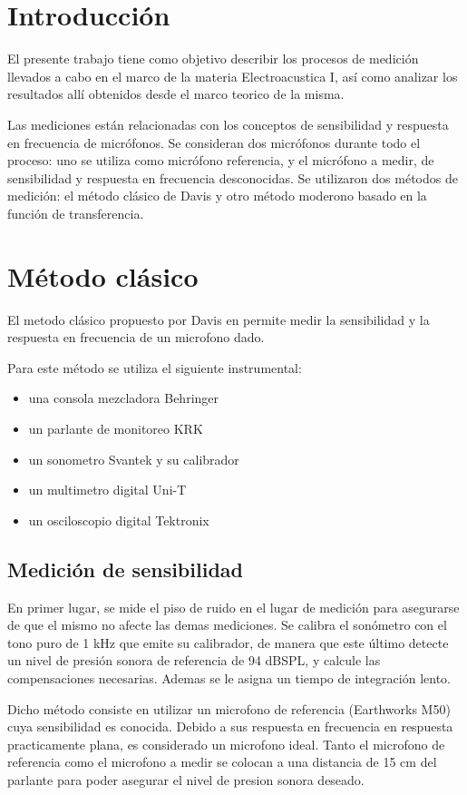 \documentclass[]{article}
\begin{document}
\begin{multicols}{2}
\section{Introducción}
El presente trabajo tiene como objetivo describir los procesos de medición
llevados a cabo en el marco de la materia Electroacustica I, así como analizar
los resultados allí obtenidos desde el marco teorico de la misma.

Las mediciones están relacionadas con los conceptos de sensibilidad y respuesta
 en frecuencia de micrófonos. Se consideran dos micrófonos durante todo el
proceso: uno se utiliza como micrófono referencia, y el micrófono a medir, de
sensibilidad y respuesta en frecuencia desconocidas. Se utilizaron dos métodos
de medición: el método clásico de Davis y otro método moderono basado en la
función de transferencia.
\section{Método clásico}
El metodo clásico propuesto por Davis en \cite{davis2006sound} permite medir
la sensibilidad y la respuesta en frecuencia de un microfono dado.

Para este método se utiliza el siguiente instrumental:
\begin{itemize}
\item una consola mezcladora Behringer
\item un parlante de monitoreo KRK
\item un sonometro Svantek y su calibrador
\item un multimetro digital Uni-T
\item un osciloscopio digital Tektronix
\end{itemize}

\subsection{Medición de sensibilidad}
En primer lugar, se mide el piso de ruido en el lugar de medición para asegurarse
de que el mismo no afecte las demas mediciones. Se calibra el sonómetro con el
tono puro de 1 kHz que emite su calibrador, de manera que este último detecte un
nivel de presión sonora de referencia de 94 dBSPL, y calcule las compensaciones
necesarias. Ademas se le asigna un tiempo de integración lento.

Dicho método consiste en utilizar un microfono de referencia (Earthworks M50)
cuya sensibilidad es conocida. Debido a sus respuesta en frecuencia en respuesta
practicamente plana, es considerado un microfono ideal. Tanto el microfono de
referencia como el microfono a medir se colocan a una distancia de 15 cm del
parlante para poder asegurar el nivel de presion sonora deseado.


\end{multicols}
\end{document}

